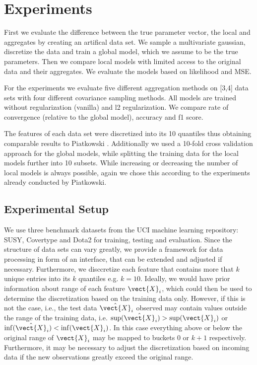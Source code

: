 
\chapter{Experiments}
\label{chapter:ch5}
First we evaluate the difference between the true parameter vector, the local and aggregates by creating an artifical data set. We sample a multivariate gaussian, discretize the data and train a global model, which we assume to be the true parameters.
Then we compare local models with limited access to the original data and their aggregates. We evaluate the models based on likelihood and MSE.

For the experiments we evaluate five different aggregation methods on [3,4] data sets with four different covariance sampling methods.
All models are trained without regularization (vanilla) and l2 regularization. 
We compare rate of convergence (relative to the global model), accuracy and f1 score.

The features of each data set were discretized into its 10 quantiles thus obtaining comparable results to Piatkowski \cite{piatkowski2019distributed}. 
Additionally we used a 10-fold cross validation approach for the global models, while splitting the training data for the local models further into 10 subsets.
While increasing or decreasing the number of local models is always possible, again we chose this according to the experiments already conducted by Piatkowski.

\section{Experimental Setup}

We use three benchmark datasets from the UCI machine learning repository: SUSY\cite{baldi2014searching}, Covertype\cite{blackard2000comparison} and Dota2\cite{tridgell2016dota2} for training, testing and evaluation.
Since the structure of data sets can vary greatly, we provide a framework for data processing in form of an interface, that can be extended and adjusted if necessary.
Furthermore, we disccretize each feature that contains more that $k$ unique entries into its $k$ quantiles e.g. $k=10$.
Ideally, we would have prior information about range of each feature $\vect{X}_i$, which could then be used to determine the discretization based on the training data only. 
However, if this is not the case, i.e., the test data $\hat{\vect{X}}_i$ observed may contain values outside the range of the training data, i.e. $\sup(\hat{\vect{X}}_i) > \sup(\vect{X}_i) $ or  $\inf(\hat{\vect{X}}_i) < \inf(\vect{X}_i) $.
In this case everything above or below the original range of $\vect{X}_i$ may be mapped to buckets $0$ or $k+1$ respectively.
Furthermore, it may be necessary to adjust the discretization based on incoming data if the new observations greatly exceed the original range.

